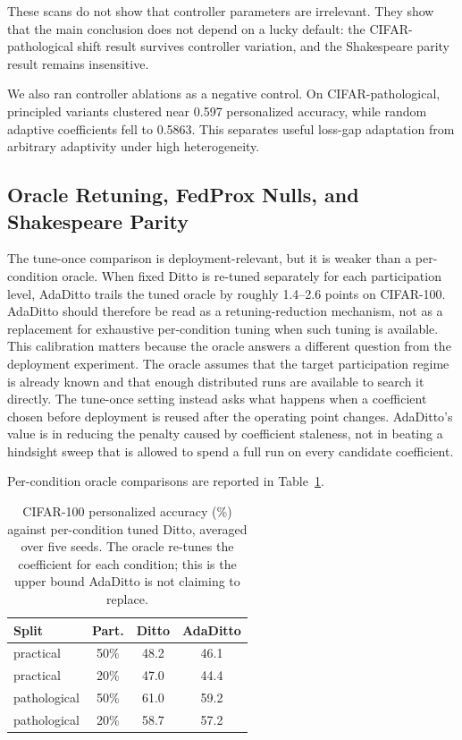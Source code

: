 \documentclass[letterpaper]{article} %
\begin{document}
These scans do not show that controller parameters are irrelevant.
They show that the main conclusion does not depend on a lucky
default: the CIFAR-pathological shift result survives controller
variation, and the Shakespeare parity result remains insensitive.

We also ran controller ablations as a negative control. On
CIFAR-pathological, principled variants clustered near 0.597
personalized accuracy, while random adaptive coefficients fell to
0.5863. This separates useful loss-gap adaptation from arbitrary
adaptivity under high heterogeneity.

\subsection{Oracle Retuning, FedProx Nulls, and Shakespeare Parity}

The tune-once comparison is deployment-relevant, but it is weaker
than a per-condition oracle. When fixed Ditto is re-tuned separately
for each participation level, AdaDitto trails the tuned oracle by
roughly 1.4--2.6 points on CIFAR-100. AdaDitto should therefore
be read as a retuning-reduction mechanism, not as a replacement
for exhaustive per-condition tuning when such tuning is available.
This calibration matters because the oracle answers a different
question from the deployment experiment. The oracle assumes that the
target participation regime is already known and that enough
distributed runs are available to search it directly. The tune-once
setting instead asks what happens when a coefficient chosen before
deployment is reused after the operating point changes. AdaDitto's
value is in reducing the penalty caused by coefficient staleness, not
in beating a hindsight sweep that is allowed to spend a full run on
every candidate coefficient.

Per-condition oracle comparisons are reported in
Table~\ref{tab:oracle-comparison}.

\begin{table}[t]
\centering
\scriptsize
\setlength{\tabcolsep}{4pt}
\renewcommand{\arraystretch}{1.08}
\begin{tabular}{@{}lccc@{}}
\toprule
Split & Part. & Ditto & AdaDitto \\
\midrule
practical & 50\% & 48.2 & 46.1 \\
practical & 20\% & 47.0 & 44.4 \\
pathological & 50\% & 61.0 & 59.2 \\
pathological & 20\% & 58.7 & 57.2 \\
\bottomrule
\end{tabular}
\caption{CIFAR-100 personalized accuracy (\%) against per-condition tuned Ditto, averaged over five seeds. The oracle re-tunes the coefficient for each condition; this is the upper bound AdaDitto is not claiming to replace.}
\label{tab:oracle-comparison}
\end{table}
\end{document}
